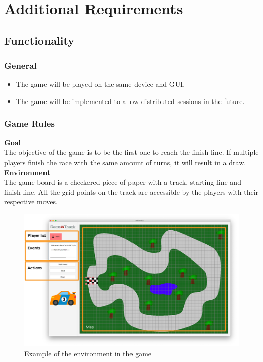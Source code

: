 \section{Additional Requirements}
	
	\subsection{Functionality}

		\subsubsection{General}
			\begin{itemize}
				\item The game will be played on the same device and \gls{GUI}.
				\item The game will be implemented to allow distributed sessions in the future.
			\end{itemize}

        \subsubsection{Game Rules}
			\textbf{Goal} \\
            The objective of the game is to be the first one to reach the finish line. If multiple players finish the race with the same amount of turns, it will result in a draw. \\
            
            \textbf{Environment} \\
            The game board is a checkered piece of paper with a track, starting line and finish line. All the grid points on the track are accessible by the players with their respective moves.
            \begin{figure}[H]
                \centering
                \includegraphics[width=14cm,keepaspectratio,center]{img/Additional-Requirements_Environment-Example.png}
                \caption{Example of the environment in the game}
            \end{figure}

